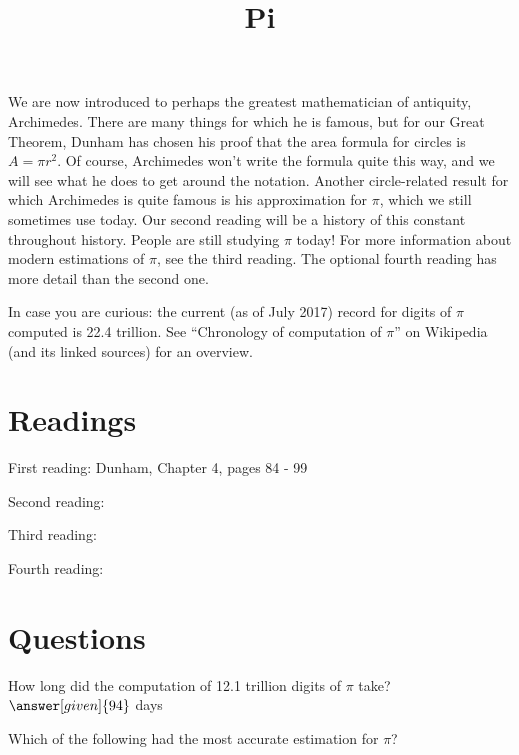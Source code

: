 \documentclass[nooutcomes]{ximera}
\title{Pi}
\begin{document}
\begin{abstract}
    
\end{abstract}
\maketitle

We are now introduced to perhaps the greatest mathematician of antiquity, Archimedes.  There are many things for which he is famous, but for our Great Theorem, Dunham has chosen his proof that the area formula for circles is $A = \pi r^2$.  Of course, Archimedes won't write the formula quite this way, and we will see what he does to get around the notation.  Another circle-related result for which Archimedes is quite famous is his approximation for $\pi$, which we still sometimes use today.  Our second reading will be a history of this constant throughout history.  People are still studying $\pi$ today!  For more information about modern estimations of $\pi$, see the third reading.  The optional fourth reading has more detail than the second one.

In case you are curious: the current (as of July 2017) record for digits of $\pi$ computed is 22.4 trillion.  See ``Chronology of computation of $\pi$'' on Wikipedia (and its linked sources) for an overview.


\section{Readings}
First reading: Dunham, Chapter 4, pages 84 - 99

Second reading: 

Third reading: 

Fourth reading: 

\section{Questions}

\begin{question}
How long did the computation of 12.1 trillion digits of $\pi$ take? $\answer[given]{94}$ days
\end{question}

\begin{question}
Which of the following had the most accurate estimation for $\pi$?
\begin{multipleChoice}
\end{multipleChoice}
\end{question}


%
\end{document}
